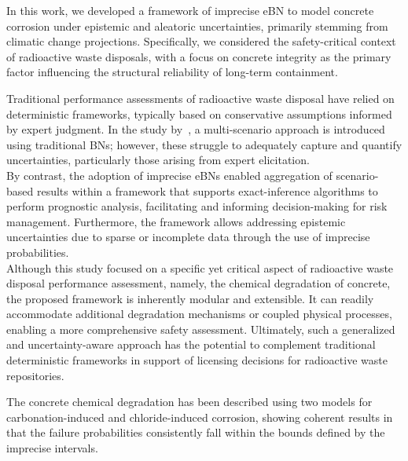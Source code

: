 In this work, we developed a framework of imprecise eBN to model concrete corrosion under epistemic and aleatoric uncertainties, primarily stemming from climatic change projections. 
Specifically, we considered the safety-critical context of radioactive waste disposals, with a focus on concrete integrity as the primary factor influencing the structural reliability of long-term containment.

Traditional performance assessments of radioactive waste disposal have relied on deterministic frameworks, typically based on conservative assumptions informed by expert judgment. In the study by~\textcite{tosoni_scenario_2018}, a multi-scenario approach is introduced using traditional BNs; however, these struggle to adequately capture and quantify uncertainties, particularly those arising from expert elicitation.\\
By contrast, the adoption of imprecise eBNs enabled aggregation of scenario-based results within a framework that supports exact-inference algorithms to perform prognostic analysis, facilitating and informing decision-making for risk management. Furthermore, the framework allows addressing epistemic uncertainties due to sparse or incomplete data through the use of imprecise probabilities.\\
Although this study focused on a specific yet critical aspect of radioactive waste disposal performance assessment, namely, the chemical degradation of concrete, the proposed framework is inherently modular and extensible. It can readily accommodate additional degradation mechanisms or coupled physical processes, enabling a more comprehensive safety assessment. Ultimately, such a generalized and uncertainty-aware approach has the potential to complement traditional deterministic frameworks in support of licensing decisions for radioactive waste repositories.

The concrete chemical degradation has been described using two models for carbonation-induced and chloride-induced corrosion, showing coherent results in that the failure probabilities consistently fall within the bounds defined by the imprecise intervals.

